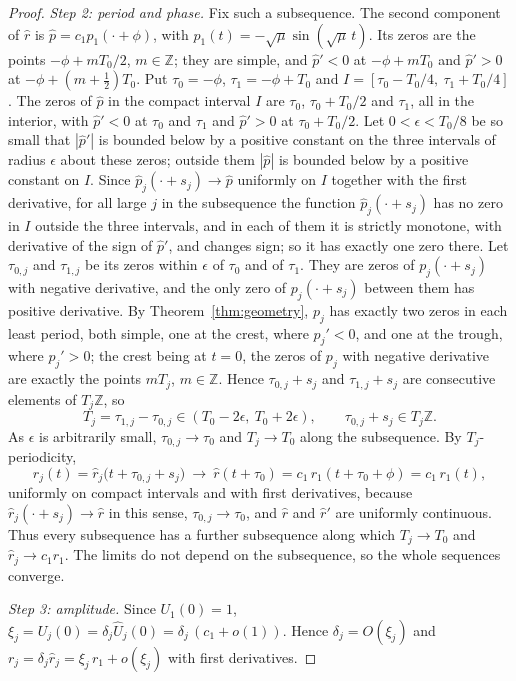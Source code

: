 \begin{proof}
\emph{Step 2: period and phase.} Fix such a subsequence. The second component of $\hat r$ is $\hat p=c_1p_1(\cdot+\phi)$, with $p_1(t)=-\sqrt\mu\sin(\sqrt\mu\,t)$. Its zeros are the points $-\phi+mT_0/2$, $m\in\mathbb Z$; they are simple, and $\hat p'<0$ at $-\phi+mT_0$ and $\hat p'>0$ at $-\phi+(m+\tfrac12)T_0$. Put $\tau_0=-\phi$, $\tau_1=-\phi+T_0$ and $I=[\tau_0-T_0/4,\ \tau_1+T_0/4]$. The zeros of $\hat p$ in the compact interval $I$ are $\tau_0$, $\tau_0+T_0/2$ and $\tau_1$, all in the interior, with $\hat p'<0$ at $\tau_0$ and $\tau_1$ and $\hat p'>0$ at $\tau_0+T_0/2$. Let $0<\epsilon<T_0/8$ be so small that $|\hat p'|$ is bounded below by a positive constant on the three intervals of radius $\epsilon$ about these zeros; outside them $|\hat p|$ is bounded below by a positive constant on $I$. Since $\hat p_j(\cdot+s_j)\to\hat p$ uniformly on $I$ together with the first derivative, for all large $j$ in the subsequence the function $\hat p_j(\cdot+s_j)$ has no zero in $I$ outside the three intervals, and in each of them it is strictly monotone, with derivative of the sign of $\hat p'$, and changes sign; so it has exactly one zero there. Let $\tau_{0,j}$ and $\tau_{1,j}$ be its zeros within $\epsilon$ of $\tau_0$ and of $\tau_1$. They are zeros of $p_j(\cdot+s_j)$ with negative derivative, and the only zero of $p_j(\cdot+s_j)$ between them has positive derivative. By Theorem~\ref{thm:geometry}, $p_j$ has exactly two zeros in each least period, both simple, one at the crest, where $p_j'<0$, and one at the trough, where $p_j'>0$; the crest being at $t=0$, the zeros of $p_j$ with negative derivative are exactly the points $mT_j$, $m\in\mathbb Z$. Hence $\tau_{0,j}+s_j$ and $\tau_{1,j}+s_j$ are consecutive elements of $T_j\mathbb Z$, so
\[
T_j=\tau_{1,j}-\tau_{0,j}\in(T_0-2\epsilon,\ T_0+2\epsilon),\qquad \tau_{0,j}+s_j\in T_j\mathbb Z .
\]
As $\epsilon$ is arbitrarily small, $\tau_{0,j}\to\tau_0$ and $T_j\to T_0$ along the subsequence. By $T_j$-periodicity,
\[
\hat r_j(t)=\hat r_j\bigl(t+\tau_{0,j}+s_j\bigr)\ \longrightarrow\ \hat r(t+\tau_0)=c_1\,r_1(t+\tau_0+\phi)=c_1\,r_1(t),
\]
uniformly on compact intervals and with first derivatives, because $\hat r_j(\cdot+s_j)\to\hat r$ in this sense, $\tau_{0,j}\to\tau_0$, and $\hat r$ and $\hat r'$ are uniformly continuous. Thus every subsequence has a further subsequence along which $T_j\to T_0$ and $\hat r_j\to c_1r_1$. The limits do not depend on the subsequence, so the whole sequences converge.

\emph{Step 3: amplitude.} Since $U_1(0)=1$, $\xi_j=U_j(0)=\delta_j\hat U_j(0)=\delta_j\,(c_1+o(1))$. Hence $\delta_j=O(\xi_j)$ and $r_j=\delta_j\hat r_j=\xi_j\,r_1+o(\xi_j)$ with first derivatives.


\end{proof}
